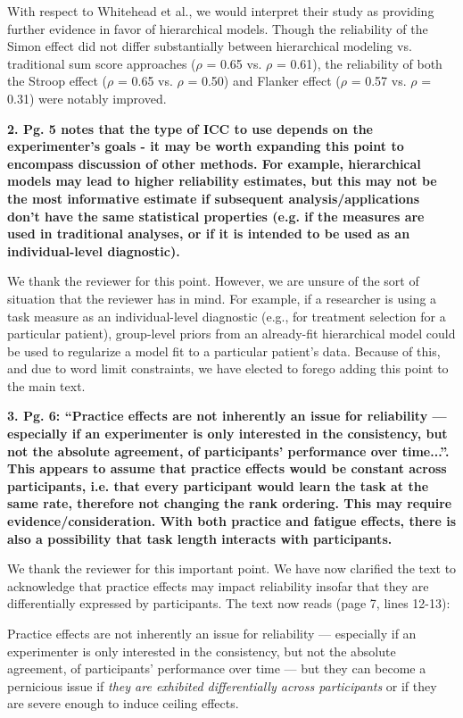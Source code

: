 \documentclass[a4paper,12pt]{article}
\begin{document}
With respect to Whitehead et al., we would interpret their study as providing further evidence in favor of hierarchical models. Though the reliability of the Simon effect did not differ substantially between hierarchical modeling vs. traditional sum score approaches ($\rho$ = 0.65 vs. $\rho$ = 0.61), the reliability of both the Stroop effect ($\rho$ = 0.65 vs. $\rho$ = 0.50) and Flanker effect ($\rho$ = 0.57 vs. $\rho$ = 0.31) were notably improved. 

\textbf{2. Pg. 5 notes that the type of ICC to use depends on the experimenter's goals - it may be worth expanding this point to encompass discussion of other methods. For example, hierarchical models may lead to higher reliability estimates, but this may not be the most informative estimate if subsequent analysis/applications don't have the same statistical properties (e.g. if the measures are used in traditional analyses, or if it is intended to be used as an individual-level diagnostic).}

We thank the reviewer for this point. However, we are unsure of the sort of situation that the reviewer has in mind. For example, if a researcher is using a task measure as an individual-level diagnostic (e.g., for treatment selection for a particular patient), group-level priors from an already-fit hierarchical model could be used to regularize a model fit to a particular patient's data. Because of this, and due to word limit constraints, we have elected to forego adding this point to the main text.

\textbf{3. Pg. 6: ``Practice effects are not inherently an issue for reliability — especially if an experimenter is only interested in the consistency, but not the absolute agreement, of participants' performance over time...''. This appears to assume that practice effects would be constant across participants, i.e. that every participant would learn the task at the same rate, therefore not changing the rank ordering. This may require evidence/consideration. With both practice and fatigue effects, there is also a possibility that task length interacts with participants.}

We thank the reviewer for this important point. We have now clarified the text to acknowledge that practice effects may impact reliability insofar that they are differentially expressed by participants. The text now reads (page 7, lines 12-13):

\begin{displayquote}
    Practice effects are not inherently an issue for reliability — especially if an experimenter is only interested in the consistency, but not the absolute agreement, of participants’ performance over time — but they can become a pernicious issue if \textit{they are exhibited differentially across participants} or if they are severe enough to induce ceiling effects.
\end{displayquote}
\end{document}
